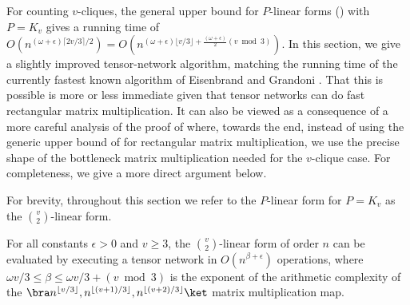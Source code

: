For counting $v$-cliques, the general upper bound for $P$-linear forms
() with $P=K_v$ gives a running time of
$O(n^{(\omega+\epsilon)\lceil 2v/3 \rceil /2}) = O(n^{(\omega +
  \epsilon)\lfloor v/3 \rfloor + \tfrac{(\omega+\epsilon)}{2}(v \bmod
  3)})$.  In this section, we give a slightly improved tensor-network
algorithm, matching the running time of the currently fastest known algorithm
of Eisenbrand and Grandoni \cite{EisenbrandG2004}.  That this is possible
is more or less immediate given that tensor networks can do fast rectangular
matrix multiplication.  It can also be viewed as a consequence of a more
careful analysis of the proof of  where,
towards the end, instead of using the generic upper bound of
 for rectangular matrix
multiplication, we use the precise shape of the bottleneck matrix
multiplication needed for the $v$-clique case. For completeness,
we give a more direct argument below.

For brevity, throughout this section we refer to the $P$-linear form
for $P=K_v$ as the $\binom{v}{2}$-linear form.
\begin{lemma}
  \label{lem:v choose 2 linear form upper bound}
For all constants $\epsilon>0$ and $v \geq 3$, the $\binom{v}{2}$-linear form of order $n$
can be evaluated by executing a tensor network in
$O(n^{\beta+\epsilon})$ operations, where $\omega v/3 \le \beta \le \omega v/3 + (v \bmod 3)$ is the exponent of the arithmetic complexity of the $\bra n^{\lfloor v/3 \rfloor}, n^{\lfloor (v+1)/3 \rfloor}, n^{\lfloor (v+2)/3 \rfloor} \ket$ matrix multiplication map.
\end{lemma}



